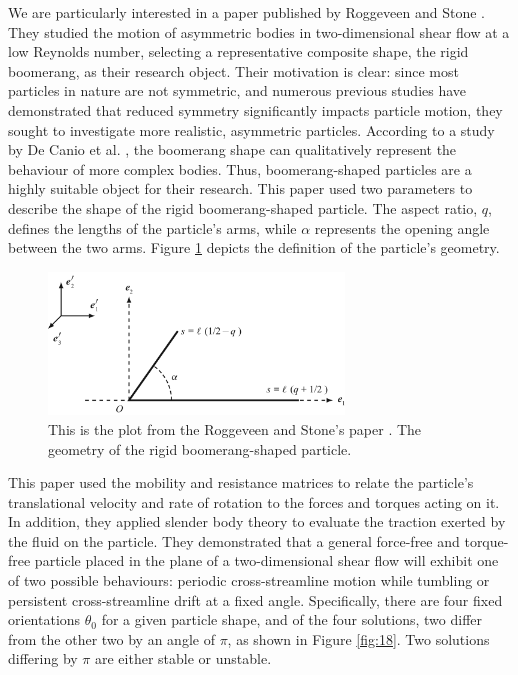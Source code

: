 \documentclass[12pt,MSc,twoside]{muthesis_2020}
\begin{document}
We are particularly interested in a paper published by Roggeveen and Stone \cite{roggeveen2022motion}. They studied the motion of asymmetric bodies in two-dimensional shear flow at a low Reynolds number, selecting a representative composite shape, the rigid boomerang, as their research object. Their motivation is clear: since most particles in nature are not symmetric, and numerous previous studies have demonstrated that reduced symmetry significantly impacts particle motion, they sought to investigate more realistic, asymmetric particles. According to a study by De Canio et al. \cite{de2017spontaneous}, the boomerang shape can qualitatively represent the behaviour of more complex bodies. Thus, boomerang-shaped particles are a highly suitable object for their research. 
This paper used two parameters to describe the shape of the rigid boomerang-shaped particle. The aspect ratio, $q$, defines the lengths of the particle's arms, while $\alpha$ represents the opening angle between the two arms. Figure \ref{fig:17} depicts the definition of the particle's geometry. 
\begin{figure}[htb]
	\begin{center}
		\includegraphics[width=0.7\textwidth]{plot/stone2.png}
		\caption{This is the plot from the Roggeveen and Stone's paper \cite{roggeveen2022motion}. The geometry of the rigid boomerang-shaped particle.}
    \label{fig:17}
	\end{center}
\end{figure}
This paper used the mobility and resistance matrices to relate the particle's translational velocity and rate of rotation to the forces and torques acting on it. In addition, they applied slender body theory to evaluate the traction exerted by the fluid on the particle. They demonstrated that a general force-free and torque-free particle placed in the plane of a two-dimensional shear flow will exhibit one of two possible behaviours: periodic cross-streamline motion while tumbling or persistent cross-streamline drift at a fixed angle. Specifically, there are four fixed orientations $\theta_0$ for a given particle shape, and of the four solutions, two differ from the other two by an angle of $\pi$, as shown in Figure \ref{fig:18}. Two solutions differing by $\pi$ are either stable or unstable.
\end{document}
